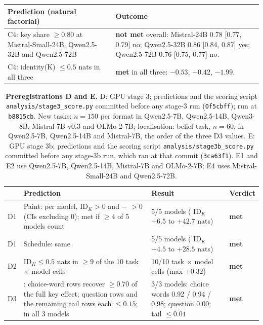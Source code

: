 \begin{table}[!ht]
\medskip
\begin{tabular}{p{}p{}}
\toprule
Prediction (natural factorial) & Outcome \\
\midrule
C4: \fmtOpt{} key share $\geq 0.80$ at Mistral-Small-24B, Qwen2.5-32B and Qwen2.5-72B & \textbf{not met} overall: Mistral-24B 0.78 [0.77, 0.79] no; Qwen2.5-32B 0.86 [0.84, 0.87] yes; Qwen2.5-72B 0.76 [0.75, 0.77] no. \\
C4: \fmtBefore{} identity(K) $\leq 0.5$ nats in all three & \textbf{met} in all three: $-0.53$, $-0.42$, $-1.99$. \\
\bottomrule
\end{tabular}
\end{table}

\begin{table}[!ht]
\centering
\footnotesize
\caption{\textbf{Preregistrations D and E.} D: GPU stage 3; predictions and the scoring script \texttt{analysis/stage3\_score.py} committed before any stage-3 run (\texttt{0f5cbff}); run at \texttt{b8815cb}. New tasks: $n = 150$ per format in Qwen2.5-7B, Qwen2.5-14B, Qwen3-8B, Mistral-7B-v0.3 and OLMo-2-7B; localisation: belief task, $n = 60$, in Qwen2.5-7B, Qwen2.5-14B and Mistral-7B, the order of the three D3 values. E: GPU stage 3b; predictions and the scoring script \texttt{analysis/stage3b\_score.py} committed before any stage-3b run, which ran at that commit (\texttt{3ca63f1}). E1 and E2 use Qwen2.5-7B, Qwen2.5-14B, Mistral-7B and OLMo-2-7B; E4 uses Mistral-Small-24B and Qwen2.5-72B.}
\label{tab:prereg-de}
\begin{tabular}{p{}p{}p{}p{}}
\toprule
 & Prediction & Result & Verdict \\
\midrule
D1 & Paint: per model, \fmtOpt{} ID$_K > 0$ and \fmtOpt{} $-$ \fmtNone{} $> 0$ (CIs excluding 0); met if $\geq 4$ of 5 models count & 5/5 models (\fmtOpt{} ID$_K$ $+6.5$ to $+42.7$ nats) & \textbf{met} \\
D1 & Schedule: same & 5/5 models (\fmtOpt{} ID$_K$ $+4.5$ to $+28.5$ nats) & \textbf{met} \\
D2 & \fmtBefore{} ID$_K \leq 0.5$ nats in $\geq 9$ of the 10 task $\times$ model cells & 10/10 task $\times$ model cells (max $+0.32$) & \textbf{met} \\
D3 & \fmtOpt{}: choice-word rows recover $\geq 0.70$ of the full key effect; question rows and the remaining tail rows each $\leq 0.15$; in all 3 models & 3/3 models: choice words 0.92 / 0.94 / 0.98; question 0.00; tail $\leq 0.01$ & \textbf{met} \\

\end{tabular}
\end{table}
